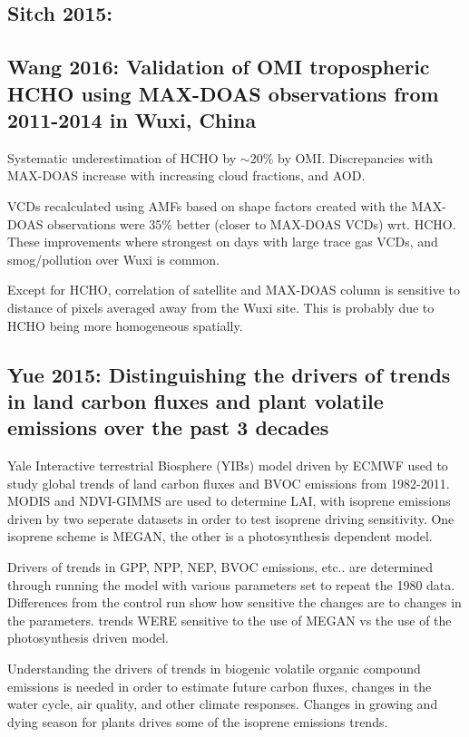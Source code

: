 \documentclass[11pt]{article} %
\begin{document}
  \subsection{Sitch 2015: }
  
  \subsection{Wang 2016: Validation of OMI tropospheric HCHO using MAX-DOAS observations from 2011-2014 in Wuxi, China}
    \citet{Wang2016}
    Systematic underestimation of HCHO by $\sim$20\% by OMI.
    Discrepancies with MAX-DOAS increase with increasing cloud fractions, and AOD.
    
    VCDs recalculated using AMFs based on shape factors created with the MAX-DOAS observations were 35\% better (closer to MAX-DOAS VCDs) wrt. HCHO.
    These improvements where strongest on days with large trace gas VCDs, and smog/pollution over Wuxi is common.
    
    Except for HCHO, correlation of satellite and MAX-DOAS column is sensitive to distance of pixels averaged away from the Wuxi site.
    This is probably due to HCHO being more homogeneous spatially.
    
  \subsection{Yue 2015: Distinguishing the drivers of trends in land carbon fluxes and plant
volatile emissions over the past 3 decades}
    \citet{Yue2015}
    Yale Interactive terrestrial Biosphere (YIBs) model driven by ECMWF used to study global trends of land carbon fluxes and BVOC emissions from 1982-2011.
    MODIS and NDVI-GIMMS are used to determine LAI, with isoprene emissions driven by two seperate datasets in order to test isoprene driving sensitivity.
    One isoprene scheme is MEGAN, the other is a photosynthesis dependent model.
    
    Drivers of trends in GPP, NPP, NEP, BVOC emissions, etc.. are determined through running the model with various parameters set to repeat the 1980 data.
    Differences from the control run show how sensitive the changes are to changes in the parameters.
    trends WERE sensitive to the use of MEGAN vs the use of the photosynthesis driven model.
    
    Understanding the drivers of trends in biogenic volatile organic compound emissions is needed in order to estimate future carbon fluxes, changes in the water cycle, air quality, and other climate responses.
    Changes in growing and dying season for plants drives some of the isoprene emissions trends.
    
\end{document}
